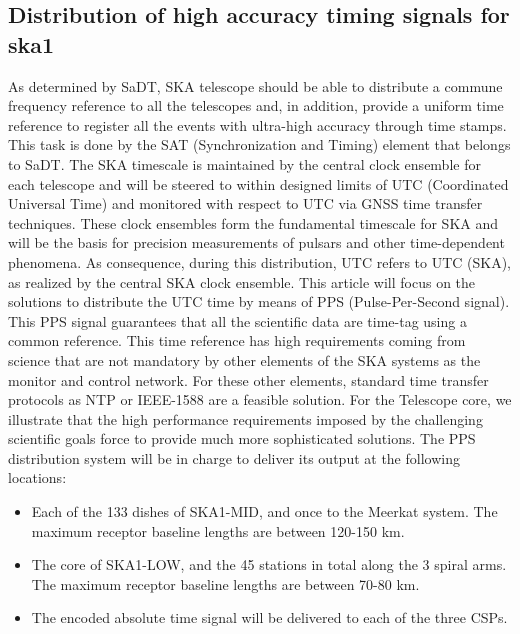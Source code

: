 
\subsection{Distribution of high accuracy timing signals for ska1}

As determined by SaDT, SKA telescope should be able to distribute a commune frequency reference to all the telescopes and, in addition, provide a uniform time reference to register all the events with ultra-high accuracy through time stamps. This task is done by the SAT (Synchronization and Timing) element that belongs to SaDT. The SKA timescale is maintained by the central clock ensemble for each telescope and will be steered to within designed limits of UTC (Coordinated Universal Time) and monitored with respect to UTC via GNSS time transfer techniques. These clock ensembles form the fundamental timescale for SKA and will be the basis for precision measurements of pulsars and other time-dependent phenomena. As consequence, during this distribution, UTC refers to UTC (SKA), as realized by the central SKA clock ensemble.
This article will focus on the solutions to distribute the UTC time by means of PPS (Pulse-Per-Second signal). This PPS signal guarantees that all the scientific data are time-tag using a common reference. This time reference has high requirements coming from science that are not mandatory by other elements of the SKA systems as the monitor and control network. For these other elements, standard time transfer protocols as NTP or IEEE-1588 are a feasible solution. For the Telescope core, we illustrate that the high performance requirements imposed by the challenging scientific goals force to provide much more sophisticated solutions. 
The PPS distribution system will be in charge to deliver its output at the following locations:

\begin{itemize}
	\item {Each of the 133 dishes of SKA1-MID, and once to the Meerkat system. The maximum receptor baseline lengths are between 120-150 km.}
	\item {The core of SKA1-LOW, and the 45 stations in total along the 3 spiral arms. The maximum receptor baseline lengths are between 70-80 km. }
	\item {The encoded absolute time signal will be delivered to each of the three CSPs.}
\end{itemize}
 
